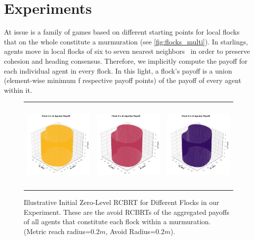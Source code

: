 \section{Experiments}
\label{sec:expts}
%
At issue is a family of games based on different starting points for local flocks that on the whole constitute a murmuration (see \autoref{fig:flocks_multi}). 
In starlings, agents move in local flocks of six to seven nearest neighbors~\cite{Ballerini1232} in order to preserve cohesion and heading consensus.  Therefore, we implicitly compute the payoff for each individual agent in every flock. In this light, a flock's payoff is a union (element-wise minimum f respective payoff points) of the payoff of every agent within it. 
%
\begin{figure}[tb!]
	\centering
	\begin{tabular}{ccc} 
		\includegraphics[height=12em,width=10em]{figures/flock_2.jpg} 
		&
		\includegraphics[height=12em,width=10em]{figures/flock_4.jpg} 
		& 
		\includegraphics[height=12em,width=10em]{figures/flock_6.jpg} 
	\end{tabular}
	\caption{\footnotesize Illustrative Initial Zero-Level RCBRT for Different Flocks in our Experiment. These are the avoid RCBRTs of the aggregated payoffs of all  agents that constitute each  flock within a murmuration.  (Metric reach radius=$0.2m$, Avoid Radius=$0.2m$).} 
	\label{fig:flocks_multi}
\end{figure}

